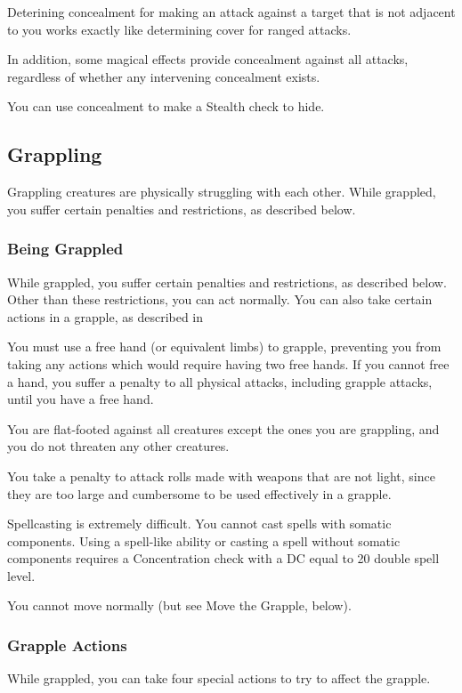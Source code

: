 Deterining concealment for making an attack against a target that is not adjacent to you works exactly like determining cover for ranged attacks.

In addition, some magical effects provide concealment against all attacks, regardless of whether any intervening concealment exists.

 You can use concealment to make a Stealth check to hide.

\subsection{Grappling}
Grappling creatures are physically struggling with each other. While grappled, you suffer certain penalties and restrictions, as described below. 

\subsubsection{Being Grappled}
While grappled, you suffer certain penalties and restrictions, as described below. Other than these restrictions, you can act normally. You can also take certain actions in a grapple, as described in  
\begin{itemize*}
    \item You must use a free hand (or equivalent limbs) to grapple, preventing you from taking any actions which would require having two free hands. If you cannot free a hand, you suffer a  penalty to all physical attacks, including grapple attacks, until you have a free hand.
    \item You are flat-footed against all creatures except the ones you are grappling, and you do not threaten any other creatures.
    \item You take a  penalty to attack rolls made with weapons that are not light, since they are too large and cumbersome to be used effectively in a grapple.
    \item Spellcasting is extremely difficult. You cannot cast spells with somatic components. Using a spell-like ability or casting a spell without somatic components requires a Concentration check with a DC equal to 20 \add double spell level.
    \item You cannot move normally (but see Move the Grapple, below).
\end{itemize*}

\subsubsection{Grapple Actions}
While grappled, you can take four special actions to try to affect the grapple.

